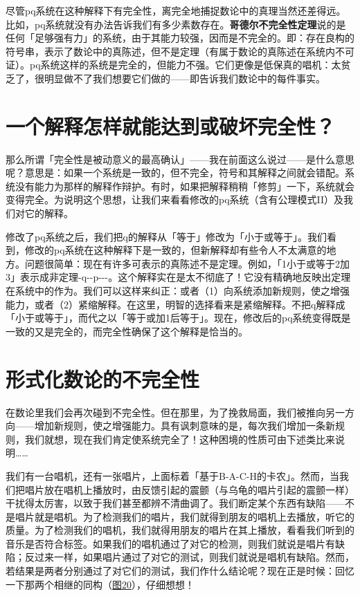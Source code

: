 \documentclass[
  12pt,
  twoside,
  openright,
  oldfontcommands,
]{memoir}
\newcommand{\heititext}[1]{{\heifamily\bfseries #1}}
\begin{document}
尽管pq系统在这种解释下有完全性，离完全地捕捉数论中的真理当然还差得远。比如，pq系统就没有办法告诉我们有多少素数存在。\heititext{哥德尔不完全性定理}说的是任何「足够强有力」的系统，由于其能力较强，因而是不完全的。即：存在良构的符号串，表示了数论中的真陈述，但不是定理（有属于数论的真陈述在系统内不可证）。pq系统这样的系统是完全的，但能力不强。它们更像是低保真的唱机：太贫乏了，很明显做不了我们想要它们做的------即告诉我们数论中的每件事实。

\section{一个解释怎样就能达到或破坏完全性？}

那么所谓「完全性是被动意义的最高确认」------我在前面这么说过------是什么意思呢？意思是：如果一个系统是一致的，但不完全，符号和其解释之间就会错配。系统没有能力为那样的解释作辩护。有时，如果把解释稍稍「修剪」一下，系统就会变得完全。为说明这个思想，让我们来看看修改的pq系统（含有公理模式II）及我们对它的解释。

修改了pq系统之后，我们把q的解释从「等于」修改为「小于或等于」。我们看到，修改的pq系统在这种解释下是一致的，但新解释却有些令人不太满意的地方。问题很简单：现在有许多可表示的真陈述不是定理。例如，「1小于或等于2加3」表示成非定理-q-\/-p-\/-\/-。这个解释实在是太不彻底了！它没有精确地反映出定理在系统中的作为。我们可以这样来纠正：或者（1）向系统添加新规则，使之增强能力，或者（2）紧缩解释。在这里，明智的选择看来是紧缩解释。不把q解释成「小于或等于」，而代之以「等于或加1后等于」。现在，修改后的pq系统变得既是一致的又是完全的，而完全性确保了这个解释是恰当的。

\section{形式化数论的不完全性}

在数论里我们会再次碰到不完全性。但在那里，为了挽救局面，我们被推向另一方向------增加新规则，使之增强能力。具有讽刺意味的是，每次我们增加一条新规则，我们就想，现在我们肯定使系统完全了！这种困境的性质可由下述类比来说明\ldots\ldots{}

我们有一台唱机，还有一张唱片，上面标着「基于B-A-C-H的卡农」。然而，当我们把唱片放在唱机上播放时，由反馈引起的震颤（与乌龟的唱片引起的震颤一样）干扰得太厉害，以致于我们甚至都辨不清曲调了。我们断定某个东西有缺陷------不是唱片就是唱机。为了检测我们的唱片，我们就得到朋友的唱机上去播放，听它的质量。为了检测我们的唱机，我们就得用朋友的唱片在其上播放，看看我们听到的音乐是否符合标签。如果我们的唱机通过了对它的检测，则我们就说是唱片有缺陷；反过来一样，如果唱片通过了对它的测试，则我们就说是唱机有缺陷。然而，若结果是两者分别通过了对它们的测试，我们作什么结论呢？现在正是时候：回忆一下那两个相继的同构（\hyperref[fig:20]{图20}），仔细想想！
\end{document}

